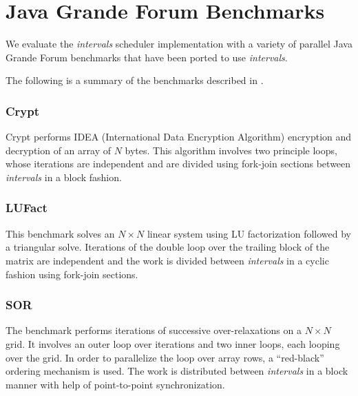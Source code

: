 
\chapter{Java Grande Forum Benchmarks}
\label{chap:appendix-benchmarks}

We evaluate the \emph{intervals} scheduler implementation with a
variety of parallel Java Grande Forum benchmarks \cite{Smith2001,
  Mathew1999, Gregg2003} that have been ported to use
\emph{intervals}.

The following is a summary of the benchmarks described in
\cite{Smith2001, Mathew1999, Gregg2003}.

\subsection*{Crypt}

Crypt performs IDEA (International Data Encryption Algorithm)
encryption and decryption of an array of $N$ bytes. This algorithm
involves two principle loops, whose iterations are independent and are
divided using fork-join sections between \emph{intervals} in a block fashion.

\subsection*{LUFact}

This benchmark solves an $N \times N$ linear system using LU factorization
followed by a triangular solve. Iterations of the double loop over the
trailing block of the matrix are independent and the work is divided
between \emph{intervals} in a cyclic fashion using fork-join sections.

\subsection*{SOR}

The benchmark performs iterations of successive over-relaxations on a
$N \times N$ grid. It involves an outer loop over iterations and two
inner loops, each looping over the grid. In order to parallelize the
loop over array rows, a ``red-black'' ordering mechanism is used. The
work is distributed between \emph{intervals} in a block manner with
help of point-to-point synchronization.

